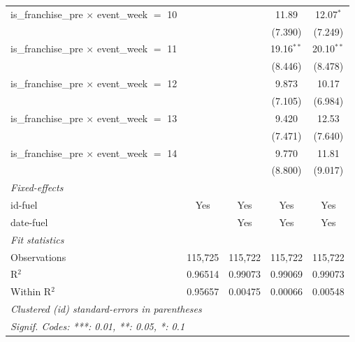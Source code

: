 \begin{tabular}{lcccc}
   is\_franchise\_pre $\times$ event\_week $=$ 10          &                &               & 11.89        & 12.07$^{*}$\\   
                                                           &                &               & (7.390)      & (7.249)\\   
   is\_franchise\_pre $\times$ event\_week $=$ 11          &                &               & 19.16$^{**}$ & 20.10$^{**}$\\   
                                                           &                &               & (8.446)      & (8.478)\\   
   is\_franchise\_pre $\times$ event\_week $=$ 12          &                &               & 9.873        & 10.17\\   
                                                           &                &               & (7.105)      & (6.984)\\   
   is\_franchise\_pre $\times$ event\_week $=$ 13          &                &               & 9.420        & 12.53\\   
                                                           &                &               & (7.471)      & (7.640)\\   
   is\_franchise\_pre $\times$ event\_week $=$ 14          &                &               & 9.770        & 11.81\\   
                                                           &                &               & (8.800)      & (9.017)\\   
   \midrule
   \emph{Fixed-effects}\\
   id-fuel                                                 & Yes            & Yes           & Yes          & Yes\\  
   date-fuel                                               &                & Yes           & Yes          & Yes\\  
   \midrule
   \emph{Fit statistics}\\
   Observations                                            & 115,725        & 115,722       & 115,722      & 115,722\\  
   R$^2$                                                   & 0.96514        & 0.99073       & 0.99069      & 0.99073\\  
   Within R$^2$                                            & 0.95657        & 0.00475       & 0.00066      & 0.00548\\  
   \midrule \midrule
   \multicolumn{5}{l}{\emph{Clustered (id) standard-errors in parentheses}}\\
   \multicolumn{5}{l}{\emph{Signif. Codes: ***: 0.01, **: 0.05, *: 0.1}}\\
\end{tabular}
\par\endgroup


